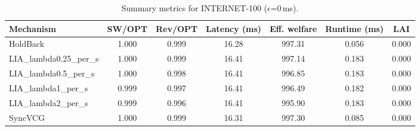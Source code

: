 \begin{table}[t]
\centering
\small
\setlength{\tabcolsep}{6pt}
\begin{tabular}{lcccccc}
\toprule
Mechanism & SW/OPT & Rev/OPT & Latency (ms) & Eff. welfare & Runtime (ms) & LAI \\
\midrule
HoldBack & 1.000 & 0.999 & 16.28 & 997.31 & 0.056 & 0.000 \\
LIA_lambda0.25_per_s & 1.000 & 0.999 & 16.41 & 997.14 & 0.183 & 0.000 \\
LIA_lambda0.5_per_s & 1.000 & 0.998 & 16.41 & 996.85 & 0.183 & 0.000 \\
LIA_lambda1_per_s & 0.999 & 0.997 & 16.41 & 996.49 & 0.182 & 0.000 \\
LIA_lambda2_per_s & 0.999 & 0.996 & 16.41 & 995.90 & 0.183 & 0.000 \\
SyncVCG & 1.000 & 0.999 & 16.31 & 997.30 & 0.085 & 0.000 \\
\bottomrule
\end{tabular}
\caption{Summary metrics for INTERNET-100 ($\epsilon$=0\,ms).}
\label{tab:internet100_eps0p0}
\end{table}
